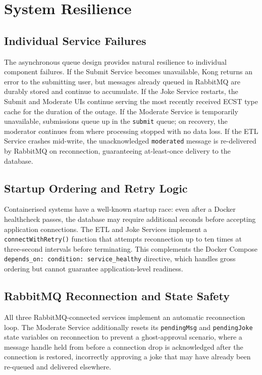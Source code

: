 \documentclass[12pt,a4paper]{article}
\begin{document}
\section{System Resilience}

\subsection{Individual Service Failures}

The asynchronous queue design provides natural resilience to individual component failures. If the Submit Service becomes unavailable, Kong returns an error to the submitting user, but messages already queued in RabbitMQ are durably stored and continue to accumulate. If the Joke Service restarts, the Submit and Moderate UIs continue serving the most recently received ECST type cache for the duration of the outage. If the Moderate Service is temporarily unavailable, submissions queue up in the \texttt{submit} queue; on recovery, the moderator continues from where processing stopped with no data loss. If the ETL Service crashes mid-write, the unacknowledged \texttt{moderated} message is re-delivered by RabbitMQ on reconnection, guaranteeing at-least-once delivery to the database.

\subsection{Startup Ordering and Retry Logic}

Containerised systems have a well-known startup race: even after a Docker healthcheck passes, the database may require additional seconds before accepting application connections. The ETL and Joke Services implement a \texttt{connectWithRetry()} function that attempts reconnection up to ten times at three-second intervals before terminating. This complements the Docker Compose \texttt{depends\_on: condition: service\_healthy} directive, which handles gross ordering but cannot guarantee application-level readiness.

\subsection{RabbitMQ Reconnection and State Safety}

All three RabbitMQ-connected services implement an automatic reconnection loop. The Moderate Service additionally resets its \texttt{pendingMsg} and \texttt{pendingJoke} state variables on reconnection to prevent a ghost-approval scenario, where a message handle held from before a connection drop is acknowledged after the connection is restored, incorrectly approving a joke that may have already been re-queued and delivered elsewhere.
\end{document}
